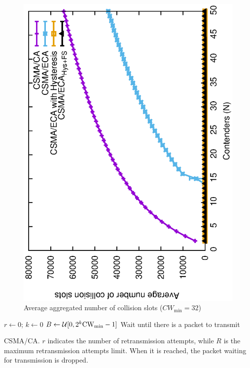 	\begin{figure}[tb]
	\centering
		\includegraphics[width=0.7\linewidth, angle=-90]{figures/collisions-perfectChannel.eps}
		\caption{Average aggregated number of collision slots ($CW_{\min}=32$)\cite{sanabria2014high}}
		\label{fig:col-CAvsECA}
	\end{figure}

	\begin{algorithm}[ht!!!]
	{
	  $r \leftarrow 0$; $k \leftarrow 0$\;
	  $B \leftarrow \mathcal{U}[0,2^k{\rm{CW}_{min}}-1]$\;
	  Wait until there is a packet to transmit\;
	}
	\caption{\small{CSMA/CA. $r$ indicates the number of retransmission attempts, while $R$ is the maximum retransmission attempts limit. When it is reached, the packet waiting for transmission is dropped.}}
	\label{alg:DCF}
	\end{algorithm}
	

